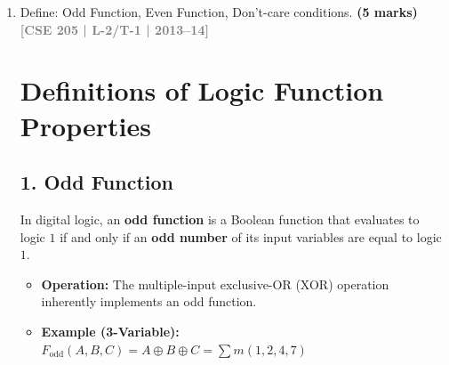 \documentclass[12pt,a3paper]{article}
\newcommand{\yr}[1]{\hfill\textcolor{gray}{\small\textbf{[#1]}}}
\newcommand{\mk}[1]{\textcolor{orange!70!black}{\small\textbf{(#1 marks)}}}
\begin{document}
\begin{enumerate}
\begin{tcolorbox}[enhanced,breakable,ansbox,colback=cA!4,colframe=cA,boxrule=0.8pt,arc=5pt,title={\textbf{Answer}},fonttitle=\bfseries\color{white},colbacktitle=cA]
\textbf{Counterexample via Truth Values:}
To definitively prove the inequality, we can assign an arbitrary set of values, such as $A = 0$, $B = 0$, and $C = 1$.

\begin{itemize}
    \item \textbf{LHS:} $((0 \cdot 0) + \overline{1}) = (0 + 0) = \mathbf{0}$
    \item \textbf{RHS:} $(\overline{0} + (0 \cdot 1)) = (1 + 0) = \mathbf{1}$
\end{itemize}

Since $0 \neq 1$, the LHS and RHS do not yield the same result for the same input combination. Therefore, \textbf{the NAND operation does not follow the associative law.}

\end{tcolorbox}

\item Define: Odd Function, Even Function, Don't-care conditions.
\mk{5} \yr{CSE 205 | L-2/T-1 | 2013--14}

\begin{tcolorbox}[enhanced,breakable,ansbox,colback=cA!4,colframe=cA,boxrule=0.8pt,arc=5pt,title={\textbf{Answer}},fonttitle=\bfseries\color{white},colbacktitle=cA]

\section*{Definitions of Logic Function Properties}

\subsection*{1. Odd Function}
In digital logic, an \textbf{odd function} is a Boolean function that evaluates to logic $1$ if and only if an \textbf{odd number} of its input variables are equal to logic $1$. 
\begin{itemize}
    \item \textbf{Operation:} The multiple-input exclusive-OR (XOR) operation inherently implements an odd function.
    \item \textbf{Example (3-Variable):} $F_{\text{odd}}(A,B,C) = A \oplus B \oplus C = \sum m(1, 2, 4, 7)$
\end{itemize}


\end{tcolorbox}
\end{enumerate}
\end{document}
